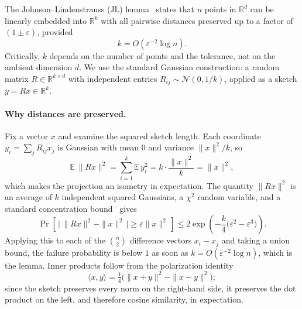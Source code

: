 \documentclass[11pt]{article}
\begin{document}
The Johnson--Lindenstrauss (JL) lemma~\cite{jl1984} states that $n$ points in $\mathbb{R}^d$ can be linearly embedded into $\mathbb{R}^k$ with all pairwise distances preserved up to a factor of $(1 \pm \varepsilon)$, provided
\begin{equation}
k = O\!\left(\varepsilon^{-2} \log n\right).
\end{equation}
Critically, $k$ depends on the number of points and the tolerance, not on the ambient dimension $d$. We use the standard Gaussian construction: a random matrix $R \in \mathbb{R}^{k \times d}$ with independent entries $R_{ij} \sim \mathcal{N}(0, 1/k)$, applied as a sketch $y = R x \in \mathbb{R}^k$.

\paragraph{Why distances are preserved.} Fix a vector $x$ and examine the squared sketch length. Each coordinate $y_i = \sum_j R_{ij} x_j$ is Gaussian with mean $0$ and variance $\|x\|^2/k$, so
\begin{equation}
\mathbb{E}\,\|Rx\|^2 = \sum_{i=1}^{k} \mathbb{E}\,y_i^2 = k \cdot \frac{\|x\|^2}{k} = \|x\|^2,
\end{equation}
which makes the projection an isometry in expectation. The quantity $\|Rx\|^2$ is an average of $k$ independent squared Gaussians, a $\chi^2$ random variable, and a standard concentration bound~\cite{dasgupta2003} gives
\begin{equation}
\Pr\!\left[\,\bigl|\,\|Rx\|^2 - \|x\|^2\,\bigr| \ge \varepsilon \|x\|^2 \,\right] \le 2\exp\!\left(-\frac{k}{4}\bigl(\varepsilon^2 - \varepsilon^3\bigr)\right).
\end{equation}
Applying this to each of the $\binom{n}{2}$ difference vectors $x_i - x_j$ and taking a union bound, the failure probability is below $1$ as soon as $k = O(\varepsilon^{-2}\log n)$, which is the lemma. Inner products follow from the polarization identity
\begin{equation}
\langle x, y\rangle = \tfrac14\bigl(\|x+y\|^2 - \|x-y\|^2\bigr);
\end{equation}
since the sketch preserves every norm on the right-hand side, it preserves the dot product on the left, and therefore cosine similarity, in expectation.
\end{document}
